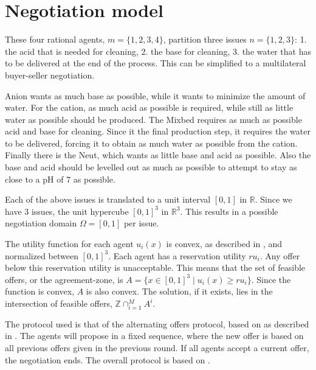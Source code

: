 \section{Negotiation model}
\label{sec:design:negmod}
These four rational agents, $m = \{1,2,3, 4\}$, partition three issues $n=\{1,2,3\}$: 1. the acid that is needed for cleaning, 2. the base for cleaning, 3. the water that has to be delivered at the end of the process. This can be simplified to a multilateral buyer-seller negotiation.

Anion wants as much base as possible, while it wants to minimize the amount of water. For the cation, as much acid as possible is required, while still as little water as possible should be produced. The Mixbed requires as much as possible acid and base for cleaning. Since it the final production step, it requires the water to be delivered, forcing it to obtain as much water as possible from the cation. Finally there is the Neut, which wants as little base and acid as possible. Also the base and acid should be levelled out as much as possible to attempt to stay as close to a pH of $7$ as possible. 

Each of the above issues is translated to a unit interval $[0, 1]$ in $\mathbb{R}$. Since we have $3$ issues, the unit hypercube $[0, 1]^3$ in  $\mathbb{R}^3$. This results in a possible negotiation domain $\Omega = [0,1]$ per issue.

The utility function for each agent $u_i(x)$ is convex, as described in , and normalized between $[0, 1]^3$. Each agent has a reservation utility $ru_i$. Any offer below this reservation utility is unacceptable. This means that the set of feasible offers, or the agreement-zone, is $A = \{ x\in [0,1]^3 \mid u_i(x)\geq ru_i\}$. Since the function is convex, $A$ is also convex. The solution, if it exists, lies in the intersection of feasible offers, $\mathbb{Z} \cap^M_{i=1}A^i$.

The protocol used is that of the alternating offers protocol, based on \citep{rubinstein1982perfect} as described in . The agents will propose in a fixed sequence, where the new offer is based on all previous offers given in the previous round. If all agents accept a current offer, the negotiation ends. The overall protocol is based on \citep{zheng2015automated}. 

